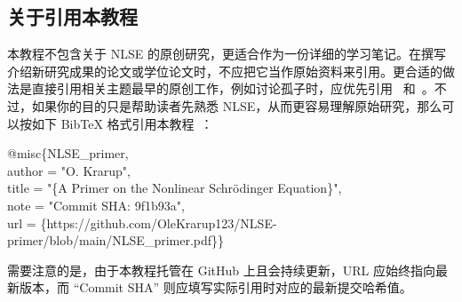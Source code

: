 \subsection{关于引用本教程}
本教程不包含关于 NLSE 的原创研究，更适合作为一份详细的学习笔记。在撰写介绍新研究成果的论文或学位论文时，不应把它当作原始资料来引用。更合适的做法是直接引用相关主题最早的原创工作，例如讨论孤子时，应优先引用~\cite{soliton_first_theory} 和~\cite{Soliton_experimental_first}。不过，如果你的目的只是帮助读者先熟悉 NLSE，从而更容易理解原始研究，那么可以按如下 BibTeX 格式引用本教程~\cite{NLSE_primer}：\\
\begin{boxA}
@misc\{NLSE\_primer,  \\
author = "O. Krarup", \\
title = "\{A Primer on the Nonlinear Schrödinger Equation\}", \\
note = "Commit SHA: 9f1b93a", \\
url = \{https://github.com/OleKrarup123/NLSE-primer/blob/main/NLSE\_primer.pdf\}\}
\end{boxA}

需要注意的是，由于本教程托管在 GitHub 上且会持续更新，URL 应始终指向最新版本，而 “Commit SHA” 则应填写实际引用时对应的最新提交哈希值。
